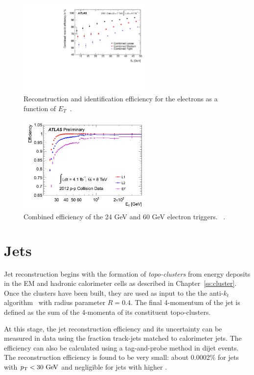 \begin{figure}[hp]
\centering
\includegraphics[width=0.6\textwidth]{fig/obj/electronID.pdf}
\caption{Reconstruction and identification efficiency for the electrons as a function of $E_{T}$~\cite{Aad:2014fxa}.}
\label{fig:electronID}
\end{figure}
\begin{figure}[hp]
\centering
\includegraphics[width=0.6\textwidth]{fig/obj/eltrigger.png}
\caption{Combined efficiency of the 24 GeV and 60 GeV electron triggers. ~\cite{eltrig}.}
\label{fig:eltrigger}
\end{figure}

\section{Jets}
Jet reconstruction begins with the formation of \emph{topo-clusters} from energy deposits in the EM and hadronic calorimeter cells as described in Chapter~\ref{ss:cluster}. Once the clusters have been built, they are used as input to the the anti-$k_t$ algorithm~\cite{antikt1,antikt2,antikt3} with radius parameter $R=0.4$. The final 4-momentum of the jet is defined as the sum of the 4-momenta of its constituent topo-clusters. 

At this stage, the jet reconstruction efficiency and its uncertainty can be measured in data using the fraction track-jets matched to calorimeter jets. The efficiency can also be calculated using a tag-and-probe method in dijet events. The reconstruction efficiency is found to be very small: about 0.0002\% for jets with $\pt< 30 \gev$ and negligible for jets with higher \pt.

